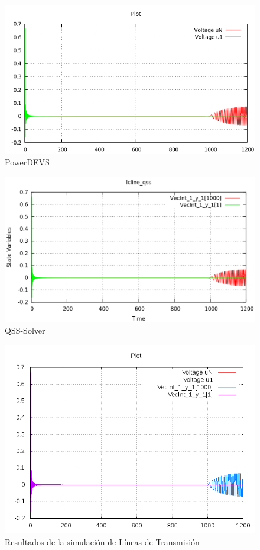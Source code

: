 \begin{figure}[H]
\centering
\begin{minipage}{0.5\textwidth}
\includegraphics[width=\linewidth]{lcline-pd.png}
\centering
PowerDEVS\\
\end{minipage}\hfill
\begin{minipage}{0.5\textwidth}
 \includegraphics[width=\linewidth]{lcline-qss.png}
\centering
QSS-Solver\\
\end{minipage}
\includegraphics[width=\linewidth]{output/lcline/lcline-all}
\caption{Resultados de la simulación de Líneas de Transmisión}
\label{graph:lclines}
\end{figure}


